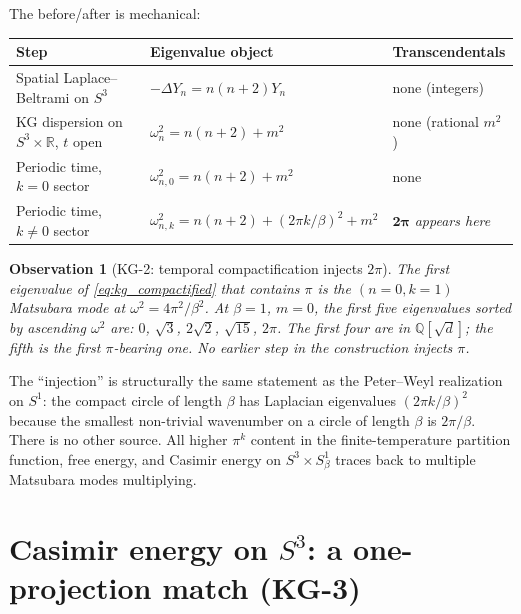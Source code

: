 \documentclass[11pt]{article}
\newtheorem{observation}{Observation}
\begin{document}
The before/after is mechanical:

\begin{center}
\small
\begin{tabular}{p{4cm} p{4cm} p{3cm}}
\toprule
Step & Eigenvalue object & Transcendentals \\
\midrule
Spatial Laplace--Beltrami on $S^3$ &
$-\Delta Y_n = n(n+2) Y_n$ & none (integers) \\
KG dispersion on $S^3 \times \mathbb{R}$, $t$ open &
$\omega_n^2 = n(n+2) + m^2$ & none (rational $m^2$) \\
Periodic time, $k = 0$ sector &
$\omega_{n,0}^2 = n(n+2) + m^2$ & none \\
Periodic time, $k \neq 0$ sector &
$\omega_{n,k}^2 = n(n+2) + (2\pi k/\beta)^2 + m^2$ &
$\boldsymbol{2\pi}$ \emph{appears here} \\
\bottomrule
\end{tabular}
\end{center}

\begin{observation}[KG-2: temporal compactification injects $2\pi$]
\label{obs:where_pi}
The first eigenvalue of \eqref{eq:kg_compactified} that contains $\pi$
is the $(n {=} 0, k {=} 1)$ Matsubara mode at $\omega^2 = 4\pi^2 / \beta^2$.
At $\beta = 1$, $m = 0$, the first five eigenvalues sorted by ascending
$\omega^2$ are: $0$, $\sqrt{3}$, $2\sqrt{2}$, $\sqrt{15}$, $2\pi$.
The first four are in $\mathbb{Q}[\sqrt{d}]$; the fifth is the first
$\pi$-bearing one.  No earlier step in the construction injects $\pi$.
\end{observation}

The ``injection'' is structurally the same statement as the
Peter--Weyl realization on $S^1$: the compact circle of length $\beta$
has Laplacian eigenvalues $(2\pi k / \beta)^2$ because the smallest
non-trivial wavenumber on a circle of length $\beta$ is $2\pi / \beta$.
There is no other source.  All higher $\pi^k$ content in the
finite-temperature partition function, free energy, and Casimir energy
on $S^3 \times S^1_\beta$ traces back to multiple Matsubara modes
multiplying.

\section{Casimir energy on $S^3$: a one-projection match (KG-3)}
\label{sec:casimir}
\end{document}
